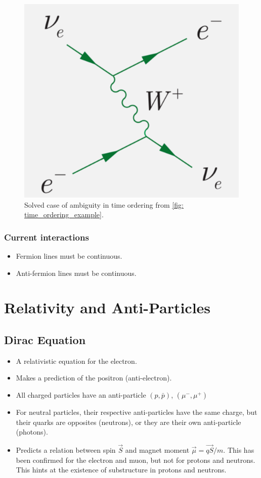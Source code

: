 \begin{figure}[h!]
\centering
\includegraphics[width = .6\textwidth]{time_ordering_example_solved.png}
\caption{Solved case of ambiguity in time ordering from \cref{fig: time_ordering_example}.}
\label{fig: time_ordering_example_solved}
\end{figure}

\subsubsection{Current interactions}
\begin{itemize}
    \item Fermion lines must be continuous. 
    \item Anti-fermion lines must be continuous.
\end{itemize}

\section{Relativity and Anti-Particles}
\subsection{Dirac Equation}
\begin{itemize}
    \item A relativistic equation for the electron.
    \item Makes a prediction of the positron (anti-electron). 
    \item All charged particles have an anti-particle $(p, \bar{p})$, $(μ^{-}, μ^{+})$
    \item For neutral particles, their respective anti-particles have the same charge, but their quarks are opposites (neutrons), or they are their own anti-particle (photons).
    \item Predicts a relation between spin $\vec{S}$ and magnet moment $\vec{μ} = \vec{qS} / m$. This has been confirmed for the electron and muon, but not for protons and neutrons. This hints at the existence of substructure in protons and neutrons.
\end{itemize}

